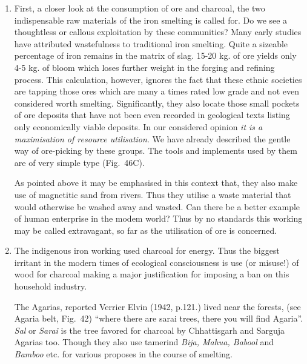 \begin{enumerate}[1)]
\item First, a closer look at the consumption of ore and charcoal, the two indispensable raw materials of the iron smelting is called for. Do we see a thoughtless or callous exploitation by these communities? Many early studies have attributed wastefulness to traditional iron smelting. Quite a sizeable percentage of iron remains in the matrix of slag. 15-20 kg. of ore yields only 4-5 kg. of bloom which loses further weight in the forging  and refining process. This calculation, however, ignores the fact that these ethnic societies are tapping those ores which are many a times rated low grade and not even considered worth smelting. Significantly, they also locate those small pockets of ore deposits that have not been even recorded in geological texts listing only economically viable deposits. In our considered opinion {\it it is a maximisation of resource utilisation}. We have already described the gentle way of ore-picking by these groups. The tools and implements used by them are of very simple type (Fig.~46C).

As pointed above it may be emphasised in this context that, they also make use of magnetitic sand from rivers. Thus they utilise a waste material that would otherwise be washed away and wasted. Can there be a better example of human enterprise in the modem world? Thus by no standards this working may be called extravagant, so far as the utilisation of ore is concerned.
\item The indigenous iron working used charcoal for energy. Thus the biggest irritant in the modern times of ecological consciousness is use (or misuse!) of wood for charcoal making a major justification for imposing a ban on this household industry. 

The Agarias, reported Verrier Elvin (1942, p.121.) lived near the forests, (see Agaria belt, Fig.~42) ``where there are sarai trees, there you will find Agaria”. {\it Sal} or {\it Sarai} is the tree favored for charcoal by Chhattisgarh and Sarguja Agarias too. Though they also use tamerind {\it Bija, Mahua, Babool} and {\it Bamboo} etc. for various proposes in the course of smelting. 
\end{enumerate}

